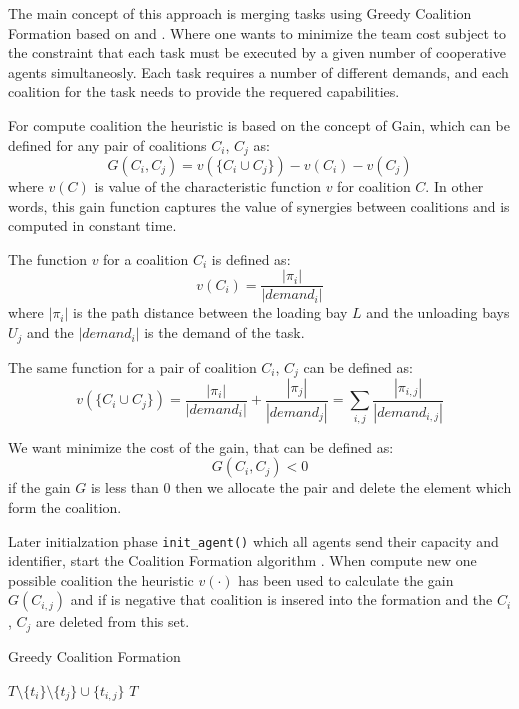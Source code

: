 The main concept of this approach is merging tasks using Greedy Coalition Formation
based on \cite{cf_greedy} and \cite{cf_farinelli}. Where one wants to minimize the 
team cost subject to the constraint that each task must be executed by a given 
number of cooperative agents simultaneosly. Each task requires a number of different 
demands, and each coalition for the task needs to provide the requered capabilities.

For compute coalition the heuristic is based on the concept of Gain, which can be 
defined for any pair of coalitions $C_i$, $C_j$ as:
\[G(C_i,C_j) = v(\{C_i \cup C_j\}) - v(C_i) - v(C_j)\]
where $v(C)$ is value of the characteristic function $v$ for coalition $C$. 
In other words, this gain function captures the value of synergies between coalitions
and is computed in constant time.

The function $v$ for a coalition $C_i$ is defined as:
\[ v(C_i) = \frac{|\pi_i|}{|demand_i|}\]
where $|\pi_i|$ is the path distance between the loading bay $L$ and the unloading bays $U_j$
and the $|demand_i|$ is the demand of the task.

The same function for a pair of coalition $C_i$, $C_j$ can be defined as:
\[  v(\{C_i \cup C_j\}) = \frac{|\pi_i|}{|demand_i|} + \frac{|\pi_j|}{|demand_j|} = \sum_{i,j} \frac{|\pi_{i,j}|}{|demand_{i,j}|} \]

We want minimize the cost of the gain, that can be defined as:
\[G(C_i,C_j) < 0 \]
if the gain $G$ is less than 0 then we allocate the pair and delete the element which
form the coalition.

Later initialzation phase \texttt{init\_agent()} which all agents send their capacity and identifier,
start the Coalition Formation algorithm \cite{cf_greedy}.
When compute new one possible coalition the heuristic  $v(\cdot)$ has been used to calculate 
the gain $G(C_{i,j})$ and if is negative that coalition is insered into the formation and the 
$C_i$ , $C_j$ are deleted from this set.

\begin{algorithm}
\caption{Greedy Coalition Formation} \label{GCF}
\begin{algorithmic}[1]
  \State {}
        $T \setminus \{ t_i\} \setminus \{t_j\} \cup \{t_{i,j}\}$
  \EndIf
  \EndIf
\EndFor
\EndFor
{} $T$
\EndProcedure
\end{algorithmic}
\end{algorithm}

